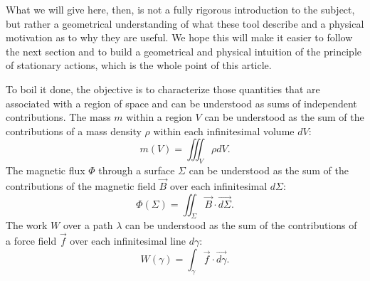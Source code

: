 \documentclass[10pt,twocolumn, nofootinbib]{revtex4-2}
\begin{document}
What we will give here, then, is not a fully rigorous introduction to the subject, but rather a geometrical understanding of what these tool describe and a physical motivation as to why they are useful. We hope this will make it easier to follow the next section and to build a geometrical and physical intuition of the principle of stationary actions, which is the whole point of this article.




To boil it done, the objective is to characterize those quantities that are associated with a region of space and can be understood as sums of independent contributions. The mass $m$ within a region $V$ can be understood as the sum of the contributions of a mass density $\rho$ within each infinitesimal volume $dV$:
\begin{equation*}
	m(V) = \iiint_V \rho dV.
\end{equation*}
The magnetic flux $\Phi$ through a surface $\Sigma$ can be understood as the sum of the contributions of the magnetic field $\vec{B}$ over each infinitesimal $d\Sigma$:
\begin{equation*}
	\Phi(\Sigma) = \iint_\Sigma \vec{B} \cdot \vec{d\Sigma}.
\end{equation*}
The work $W$ over a path $\lambda$ can be understood as the sum of the contributions of a force field $\vec{f}$ over each infinitesimal line $d\gamma$:
\begin{equation*}
	W(\gamma) = \int_\gamma \vec{f} \cdot \vec{d\gamma}.
\end{equation*}
\end{document}
